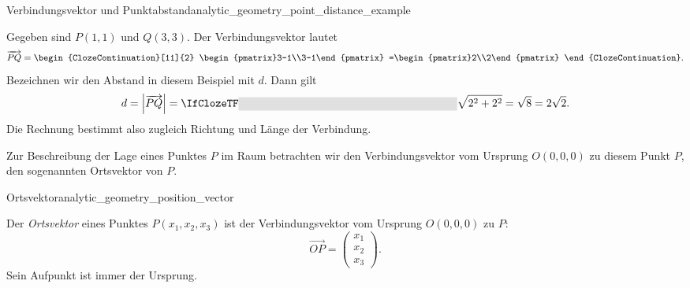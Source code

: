 \begin{ExampleBox}{Verbindungsvektor und Punktabstand}{analytic_geometry_point_distance_example}
\noindent
\begin{minipage}[c]{0.54\linewidth}
  Gegeben sind $P(1,1)$ und $Q(3,3)$. Der Verbindungsvektor lautet
  \[
    \overrightarrow{PQ}
    =\begin{ClozeContinuation}[11]{2}
      \begin{pmatrix}3-1\\3-1\end{pmatrix}
      =\begin{pmatrix}2\\2\end{pmatrix}
    \end{ClozeContinuation}.
  \]
  Bezeichnen wir den Abstand in diesem Beispiel mit $d$. Dann gilt
  \[
    d
    =\left|\overrightarrow{PQ}\right|
    =\Cloze{7cm}{\sqrt{2^2+2^2}=\sqrt 8=2\sqrt 2}.
  \]
  Die Rechnung bestimmt also zugleich Richtung und Länge der Verbindung.
\end{minipage}\hfill
\begin{minipage}[c]{0.40\linewidth}
  \centering
\end{minipage}
\end{ExampleBox}

Zur Beschreibung der Lage eines Punktes $P$ im Raum betrachten wir den
Verbindungsvektor vom Ursprung $O(0,0,0)$ zu diesem Punkt $P$, 
den sogenannten Ortsvektor von $P$.
\begin{DefinitionBox}{Ortsvektor}{analytic_geometry_position_vector}
\noindent
\begin{minipage}[c]{0.54\linewidth}
  Der \emph{Ortsvektor}  eines Punktes
  $P(x_1,x_2,x_3)$ ist der Verbindungsvektor vom Ursprung
  $O(0,0,0)$ zu $P$:
  \[
    \overrightarrow{OP}=\begin{pmatrix}x_1\\x_2\\x_3\end{pmatrix}.
  \]
  Sein Aufpunkt ist immer der Ursprung.
\end{minipage}\hfill
\begin{minipage}[c]{0.42\linewidth}
  \centering
\end{minipage}
\end{DefinitionBox}

